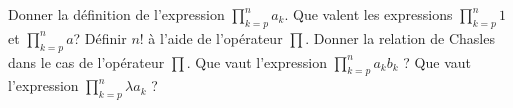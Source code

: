 %
%
	\begin{tasks}
		\task Donner la définition de l'expression $ \prod\limits_{k=p}^n a_k$.
		\task Que valent les expressions $\prod\limits_{k=p}^n 1$ et  $\prod\limits_{k=p}^n a$?
		\task Définir $n!$ à l'aide de l'opérateur $\prod$.
		\task Donner la relation de Chasles dans le cas de l'opérateur $\prod$.
		\task Que vaut l'expression $\prod\limits_{k=p}^n a_k b_k$ ?
		\task Que vaut l'expression $\prod\limits_{k=p}^n \lambda a_k$ ?
	\end{tasks}
